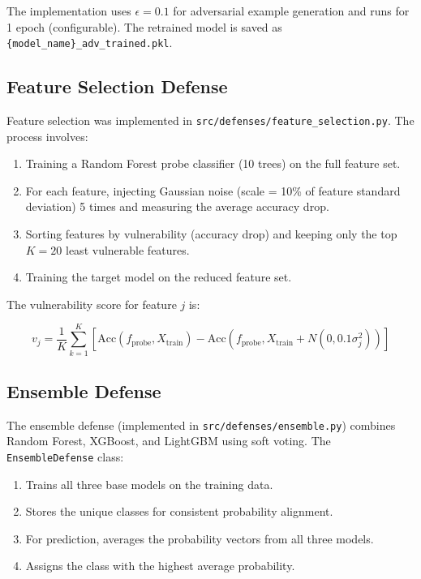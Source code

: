 \documentclass[12pt,a4paper,oneside]{report}
\begin{document}
The implementation uses $\epsilon = 0.1$ for adversarial example generation and runs for 1 epoch (configurable). The retrained model is saved as \texttt{\{model\_name\}\_adv\_trained.pkl}.

\subsection{Feature Selection Defense}

Feature selection was implemented in \texttt{src/defenses/feature\_selection.py}. The process involves:

\begin{enumerate}
    \item Training a Random Forest probe classifier (10 trees) on the full feature set.
    \item For each feature, injecting Gaussian noise (scale = 10\% of feature standard deviation) 5 times and measuring the average accuracy drop.
    \item Sorting features by vulnerability (accuracy drop) and keeping only the top $K = 20$ least vulnerable features.
    \item Training the target model on the reduced feature set.
\end{enumerate}

The vulnerability score for feature $j$ is:

\begin{equation}
    \label{eq:vuln_score}
    v_j = \frac{1}{K} \sum_{k=1}^{K} \left[ \text{Acc}(f_\text{probe}, X_\text{train}) - \text{Acc}(f_\text{probe}, X_\text{train} + N(0, 0.1\sigma_j^2)) \right]
\end{equation}

\subsection{Ensemble Defense}

The ensemble defense (implemented in \texttt{src/defenses/ensemble.py}) combines Random Forest, XGBoost, and LightGBM using soft voting. The \texttt{EnsembleDefense} class:

\begin{enumerate}
    \item Trains all three base models on the training data.
    \item Stores the unique classes for consistent probability alignment.
    \item For prediction, averages the probability vectors from all three models.
    \item Assigns the class with the highest average probability.
\end{enumerate}
\end{document}
